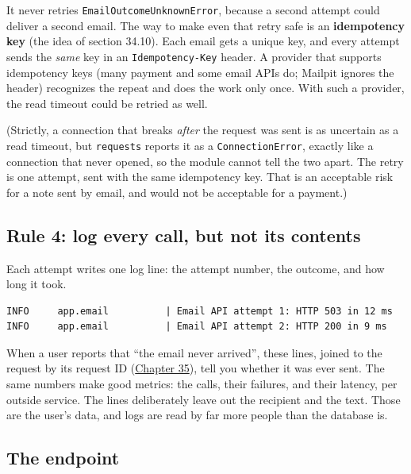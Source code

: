 It never retries \texttt{EmailOutcomeUnknownError}, because a second attempt could deliver a second email. The way to make even that retry safe is an \textbf{idempotency key} (the idea of section 34.10). Each email gets a unique key, and every attempt sends the \emph{same} key in an \texttt{Idempotency-Key} header. A provider that supports idempotency keys (many payment and some email APIs do; Mailpit ignores the header) recognizes the repeat and does the work only once. With such a provider, the read timeout could be retried as well.

(Strictly, a connection that breaks \emph{after} the request was sent is as uncertain as a read timeout, but \texttt{requests} reports it as a \texttt{ConnectionError}, exactly like a connection that never opened, so the module cannot tell the two apart. The retry is one attempt, sent with the same idempotency key. That is an acceptable risk for a note sent by email, and would not be acceptable for a payment.)

\subsection*{Rule 4: log every call, but not its contents}\label{37-reliability:rule-4-log-every-call-but-not-its-contents}

Each attempt writes one log line: the attempt number, the outcome, and how long it took.

\begin{outputbox}[short]
\begin{Verbatim}[fontsize=\codesize, breaklines, breakanywhere, breaksymbolleft={\tiny\textcolor{muted}{$\hookrightarrow$}}]
INFO     app.email          | Email API attempt 1: HTTP 503 in 12 ms
INFO     app.email          | Email API attempt 2: HTTP 200 in 9 ms
\end{Verbatim}
\end{outputbox}

\noindent{}When a user reports that ``the email never arrived'', these lines, joined to the request by its request ID (\hyperref[ch:35-observability]{Chapter 35}), tell you whether it was ever sent. The same numbers make good metrics: the calls, their failures, and their latency, per outside service. The lines deliberately leave out the recipient and the text. Those are the user's data, and logs are read by far more people than the database is.

\subsection*{The endpoint}\label{37-reliability:the-endpoint}

